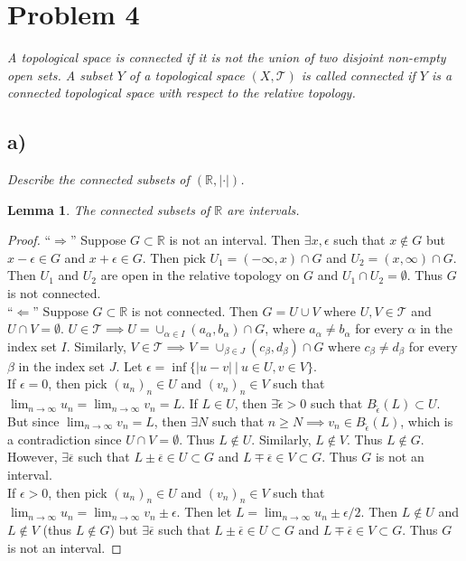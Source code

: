 \documentclass[12pt]{article}
\theoremstyle{plain}
\newtheorem{lemma}{Lemma}
\begin{document}
\section*{Problem 4}
\emph{A topological space is \emph{connected} if it is not the union of two disjoint non-empty open sets.  A subset $Y$ of a topological space $(X, \mathcal{T})$ is called connected if $Y$ is a connected topological space with respect to the relative topology.}

\subsection*{ a)}
\emph{Describe the connected subsets of $(\mathbb{R}, |\cdot|)$.}

\begin{lemma}
    \label{connected_subsets_of_R}
    The connected subsets of $\mathbb{R}$ are intervals.
\end{lemma}
\begin{proof}
    ``$\Longrightarrow$'' Suppose $G \subset \mathbb{R}$ is not an interval.  Then $\exists x,\epsilon$ such that $x \not\in G$ but $x - \epsilon \in G$ and $x + \epsilon \in G$.  Then pick $U_1 = (-\infty, x) \cap G$ and $U_2 = (x, \infty) \cap G$.  Then $U_1$ and $U_2$ are open in the relative topology on $G$ and $U_1 \cap U_2 = \emptyset$.  Thus $G$ is not connected.\\

    \noindent``$\Longleftarrow$'' Suppose $G \subset \mathbb{R}$ is not connected.  Then $G = U\cup V$ where $U,V\in \mathcal{T}$ and $U\cap V = \emptyset$.  $U \in \mathcal{T} \implies U = \cup_{\alpha \in I} (a_\alpha, b_\alpha) \cap G$, where $a_\alpha \neq b_\alpha$ for every $\alpha$ in the index set $I$.  Similarly, $V \in \mathcal{T} \implies V = \cup_{\beta\in J}(c_\beta, d_\beta) \cap G$ where $c_\beta \neq d_\beta$ for every $\beta$ in the index set $J$.  Let $\epsilon = \inf\{|u - v|\ |\ u \in U, v\in V\}$.\\

    \noindent If $\epsilon = 0$, then pick $(u_n)_n \in U$ and $(v_n)_n \in V$ such that $\lim_{n\rightarrow\infty}u_n = \lim_{n\rightarrow\infty}v_n = L$.  If $L \in U$, then $\exists \tilde\epsilon > 0$ such that $B_{\tilde\epsilon}(L) \subset U$.  But since $\lim_{n\rightarrow\infty}v_n = L$, then $\exists N$ such that $n \geq N \implies v_n \in B_{\tilde\epsilon}(L)$, which is a contradiction since $U \cap V = \emptyset$.  Thus $L \not\in U$.  Similarly, $L \not\in V$.  Thus $L \not\in G$.  However, $\exists \overline{\epsilon}$ such that $L \pm \overline{\epsilon} \in U \subset G$ and $L \mp \overline{\epsilon} \in V \subset G$.  Thus $G$ is not an interval. \\

    \noindent If $\epsilon > 0$, then pick $(u_n)_n \in U$ and $(v_n)_n \in V$ such that $\lim_{n\rightarrow\infty}u_n = \lim_{n\rightarrow\infty}v_n \pm \epsilon$.  Then let $L = \lim_{n\rightarrow\infty}u_n \pm \epsilon/2$.  Then $L \not\in U$ and $L \not\in V$ (thus $L \not\in G$) but $\exists \overline{\epsilon}$ such that $L \pm \overline{\epsilon} \in U \subset G$ and $L \mp \overline{\epsilon} \in V \subset G$.  Thus $G$ is not an interval.
\end{proof}
\end{document}
